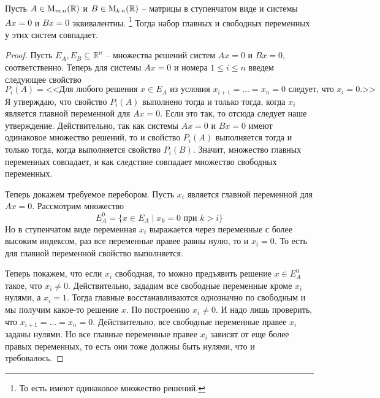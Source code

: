 \begin{claim}
Пусть $A\in\operatorname{M}_{m\,n}(\mathbb R)$ и $B\in\operatorname{M}_{k\,n}(\mathbb R)$ -- матрицы в ступенчатом виде и системы $Ax = 0$ и $Bx = 0$ эквивалентны.%
\footnote{То есть имеют одинаковое множество решений.}
Тогда набор главных и свободных переменных у этих систем совпадает.
\end{claim}
\begin{proof}

Пусть $E_A, E_B\subseteq \mathbb R^n$ -- множества решений систем $Ax = 0$ и $Bx = 0$, соответственно.
Теперь для системы $Ax = 0$ и номера $1\leqslant i \leqslant n$ введем следующее свойство 
\[
P_i(A) = \text{<<Для любого решения $x\in E_A$ из условия $x_{i+1} = \ldots = x_n = 0$ следует, что $x_i = 0$.>>}
\]
Я утверждаю, что свойство $P_i(A)$ выполнено тогда и только тогда, когда $x_i$ является главной переменной для $Ax = 0$.
Если это так, то отсюда следует наше утверждение.
Действительно, так как системы $Ax = 0$ и $Bx = 0$ имеют одинаковое множество решений, то и свойство $P_i(A)$ выполняется тогда и только тогда, когда выполняется свойство $P_i(B)$.
Значит, множество главных переменных совпадает, и как следствие совпадает множество свободных переменных.

Теперь докажем требуемое перебором.
Пусть $x_i$ является главной переменной для $Ax = 0$.
Рассмотрим множество
\[
E_A^0 = \{x\in E_A\mid x_k = 0\text{ при }k>i\}
\]
Но в ступенчатом виде переменная $x_i$ выражается через переменные с более высоким индексом, раз все переменные правее равны нулю, то и $x_i = 0$.
То есть для главной переменной свойство выполняется.

Теперь покажем, что если $x_i$ свободная, то можно предъявить решение $x\in E_A^0$ такое, что $ x_i \neq 0$.
Действительно, зададим все свободные переменные кроме $x_i$ нулями, а $x_i = 1$.
Тогда главные восстанавливаются однозначно по свободным и мы получим какое-то решение $x$.
По построению $x_i\neq 0$.
И надо лишь проверить, что $x_{i+1} = \ldots = x_n = 0$.
Действительно, все свободные переменные правее $x_i$ заданы нулями.
Но все главные переменные правее $x_i$ зависят от еще более правых переменных, то есть они тоже должны быть нулями, что и требовалось.
\end{proof}


